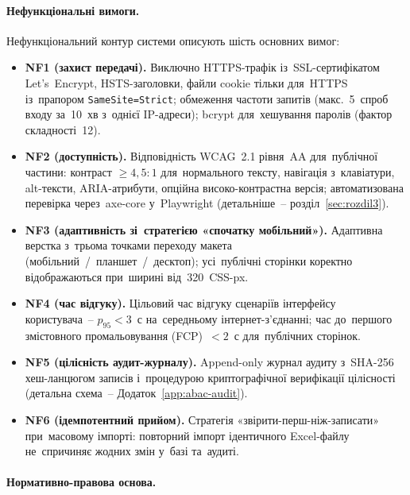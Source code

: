 \paragraph*{\textbf{Нефункціональні вимоги.}}
\label{sec:p2-req-nonfunctional}

Нефункціональний контур системи описують шість основних вимог:

\begin{itemize}
    \item \textbf{NF1 (захист передачі).} Виключно HTTPS-трафік із~SSL-сертифікатом Let's~Encrypt, HSTS-заголовки, файли cookie тільки для~HTTPS із~прапором \texttt{SameSite=Strict}; обмеження частоти запитів (макс.\ 5~спроб входу за~10~хв з~однієї IP-адреси); bcrypt для~хешування паролів (фактор складності~12).
    \item \textbf{NF2 (доступність).} Відповідність WCAG~2.1 рівня~AA для~публічної частини: контраст $\geq 4{,}5{:}1$ для~нормального тексту, навігація з~клавіатури, alt-тексти, ARIA-атрибути, опційна високо-контрастна версія; автоматизована перевірка через~axe-core у~Playwright (детальніше~-- розділ~\ref{sec:rozdil3}).
    \item \textbf{NF3 (адаптивність зі~стратегією «спочатку мобільний»).} Адаптивна верстка з~трьома точками переходу макета (мобільний~/~планшет~/~десктоп); усі~публічні сторінки коректно відображаються при~ширині від~320~CSS-px.
    \item \textbf{NF4 (час відгуку).} Цільовий час відгуку сценаріїв інтерфейсу користувача~-- $p_{95}<3$~с на~середньому інтернет-з'єднанні; час до~першого змістовного промальовування (FCP)~$<2$~с для~публічних сторінок.
    \item \textbf{NF5 (цілісність аудит-журналу).} Append-only журнал аудиту з~SHA-256 хеш-ланцюгом записів і~процедурою криптографічної верифікації цілісності (детальна схема~-- Додаток~\ref{app:abac-audit}).
    \item \textbf{NF6 (ідемпотентний прийом).} Стратегія «звірити-перш-ніж-записати» при~масовому імпорті: повторний імпорт ідентичного Excel-файлу не~спричиняє жодних змін у~базі та~аудиті.
\end{itemize}

\paragraph*{\textbf{Нормативно-правова основа.}}
\label{sec:p2-req-legal}

